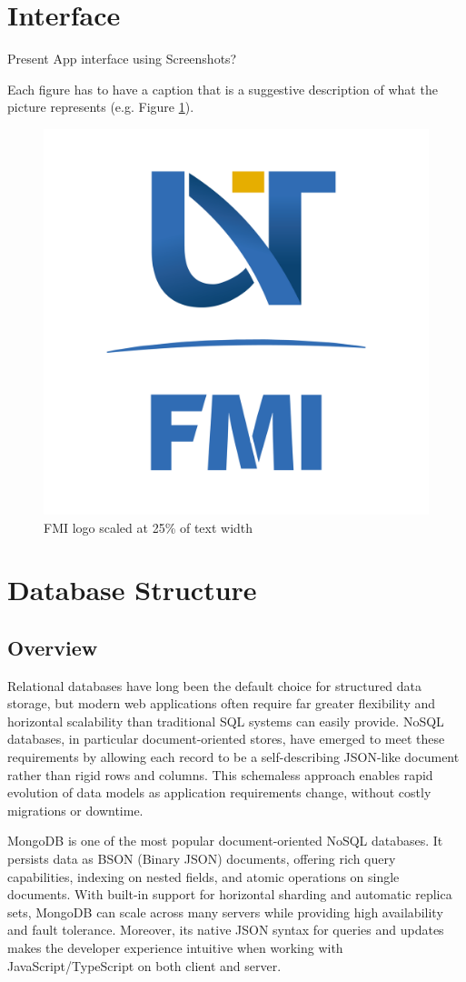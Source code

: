 \section{Interface}
Present App interface using Screenshots?

Each figure has to have a caption that is a suggestive description of what  the  picture represents (e.g. Figure \ref{fig:siglaUVT}).
\begin{figure}[!ht]
    \centering
    \includegraphics[width=0.25\linewidth]{FMI-03.png}
    \caption{ FMI logo scaled at 25\% of text width}
    \label{fig:siglaUVT}
\end{figure}

\section{Database Structure}

\subsection{Overview}

Relational databases have long been the default choice for structured data storage, but modern web applications often require far greater flexibility and horizontal scalability than traditional SQL systems can easily provide.  NoSQL databases, in particular document-oriented stores, have emerged to meet these requirements by allowing each record to be a self-describing JSON-like document rather than rigid rows and columns.  This schemaless approach enables rapid evolution of data models as application requirements change, without costly migrations or downtime.

MongoDB is one of the most popular document-oriented NoSQL databases.  It persists data as BSON (Binary JSON) documents, offering rich query capabilities, indexing on nested fields, and atomic operations on single documents.  With built-in support for horizontal sharding and automatic replica sets, MongoDB can scale across many servers while providing high availability and fault tolerance.  Moreover, its native JSON syntax for queries and updates makes the developer experience intuitive when working with JavaScript/TypeScript on both client and server.

